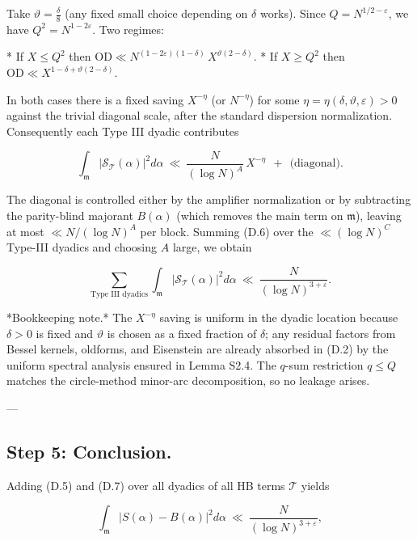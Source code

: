 \documentclass[11pt]{article}
\theoremstyle{definition}
\theoremstyle{remark}
\begin{document}
Take $\vartheta=\tfrac{\delta}{8}$ (any fixed small choice depending on $\delta$ works). Since $Q=N^{1/2-\varepsilon}$, we have $Q^2=N^{1-2\varepsilon}$. Two regimes:

* If $X\le Q^2$ then $\mathrm{OD}\ll N^{(1-2\varepsilon)(1-\delta)}\,X^{\vartheta(2-\delta)}$.
* If $X\ge Q^2$ then $\mathrm{OD}\ll X^{1-\delta+\vartheta(2-\delta)}$.

In both cases there is a fixed saving $X^{-\eta}$ (or $N^{-\eta}$) for some $\eta=\eta(\delta,\vartheta,\varepsilon)>0$ against the trivial diagonal scale, after the standard dispersion normalization. Consequently each Type III dyadic contributes

\begin{equation}
	\int_{\mathfrak m}\big|\mathcal S_{\mathcal T}(\alpha)\big|^2 d\alpha
	\ \ll\ \frac{N}{(\log N)^{A}}\,X^{-\eta}
	\ \ +\ \ \text{(diagonal)}.
	\tag{D.6}
\end{equation}

The diagonal is controlled either by the amplifier normalization or by subtracting the parity-blind majorant $B(\alpha)$ (which removes the main term on $\mathfrak m$), leaving at most $\ll N/(\log N)^A$ per block. Summing (D.6) over the $\ll(\log N)^C$ Type-III dyadics and choosing $A$ large, we obtain

\begin{equation}
	\sum_{\text{Type III dyadics}}
	\int_{\mathfrak m}\big|\mathcal S_{\mathcal T}(\alpha)\big|^2 d\alpha
	\ \ll\ \frac{N}{(\log N)^{3+\varepsilon}}.
	\tag{D.7}
\end{equation}

*Bookkeeping note.* The $X^{-\eta}$ saving is uniform in the dyadic location because $\delta>0$ is fixed and $\vartheta$ is chosen as a fixed fraction of $\delta$; any residual factors from Bessel kernels, oldforms, and Eisenstein are already absorbed in (D.2) by the uniform spectral analysis ensured in Lemma S2.4. The $q$-sum restriction $q\le Q$ matches the circle-method minor-arc decomposition, so no leakage arises.

---

\subsection*{Step 5: Conclusion.}
Adding (D.5) and (D.7) over all dyadics of all HB terms $\mathcal T$ yields

$$
	\int_{\mathfrak m}\big|S(\alpha)-B(\alpha)\big|^2 d\alpha
	\ \ll\ \frac{N}{(\log N)^{3+\varepsilon}},
$$
\end{document}
